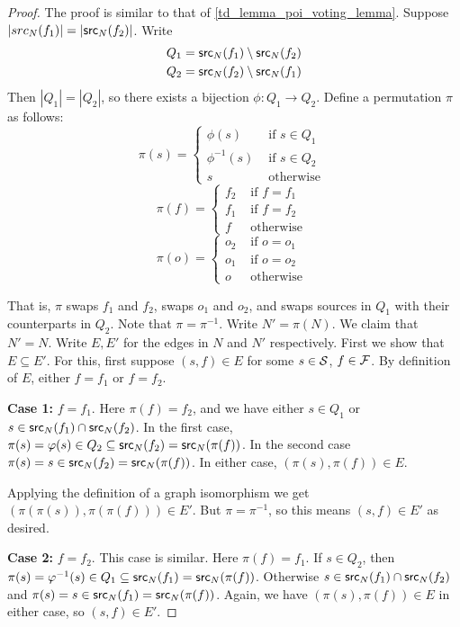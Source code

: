 \begin{proof}
The proof is similar to that of \cref{td_lemma_poi_voting_lemma}.
Suppose $|src_{N}(f_1)| = |\src_{N}(f_2)|$. Write
\begin{align*}
    Q_1 & = \src_{N}(f_1) \setminus \src_{N}(f_2) \\
    Q_2 & = \src_{N}(f_2) \setminus \src_{N}(f_1)
\end{align*}
Then $|Q_1| = |Q_2|$, so there exists a bijection $\phi: Q_1 \to Q_2$. Define a
permutation $\pi$ as follows:
\[
    \pi(s) = \begin{cases}
        \phi(s) & \text{ if } s \in Q_1 \\
        \phi^{-1}(s) & \text{ if } s \in Q_2 \\
        s & \text{ otherwise }
    \end{cases}
\]
\[
    \pi(f) = \begin{cases}
        f_2 & \text{ if } f = f_1 \\
        f_1 & \text{ if } f = f_2 \\
        f & \text{ otherwise }
    \end{cases}
\]
\[
    \pi(o) = \begin{cases}
        o_2 & \text{ if } o = o_1 \\
        o_1 & \text{ if } o = o_2 \\
        o & \text{ otherwise }
    \end{cases}
\]

That is, $\pi$ swaps $f_1$ and $f_2$, swaps $o_1$ and $o_2$, and swaps sources
in $Q_1$ with their counterparts in $Q_2$. Note that $\pi = \pi^{-1}$. Write
$N' = \pi(N)$. We claim that $N' = N$. Write $E, E'$ for the edges in $N$ and
$N'$ respectively. First we show that $E \subseteq E'$. For this, first
suppose $(s, f) \in E$ for some $s \in \S$, $f \in \F$. By definition of $E$,
either $f = f_1$ or $f = f_2$.

\textbf{Case 1:} $f = f_1$. Here $\pi(f) = f_2$, and we have either $s \in
Q_1$ or $s \in \src_{N}(f_1) \cap \src_{N}(f_2)$. In the first case, $\pi(s)
= \phi(s) \in Q_2 \subseteq \src_{N}(f_2) = \src_{N}(\pi(f))$. In the second
case $\pi(s) = s \in \src_{N}(f_2) = \src_{N}(\pi(f))$. In either case,
$(\pi(s), \pi(f)) \in E$.

Applying the definition of a graph isomorphism we get $(\pi(\pi(s)),
\pi(\pi(f))) \in E'$. But $\pi = \pi^{-1}$, so this means $(s, f) \in E'$ as
desired.

\textbf{Case 2:} $f = f_2$. This case is similar. Here $\pi(f) = f_1$. If $s
\in Q_2$, then $\pi(s) = \phi^{-1}(s) \in Q_1 \subseteq \src_{N}(f_1) =
\src_{N}(\pi(f))$. Otherwise $s \in \src_{N}(f_1) \cap \src_{N}(f_2)$ and
$\pi(s) = s \in \src_{N}(f_1) = \src_{N}(\pi(f))$. Again, we have $(\pi(s),
\pi(f)) \in E$ in either case, so $(s, f) \in E'$.


\end{proof}
